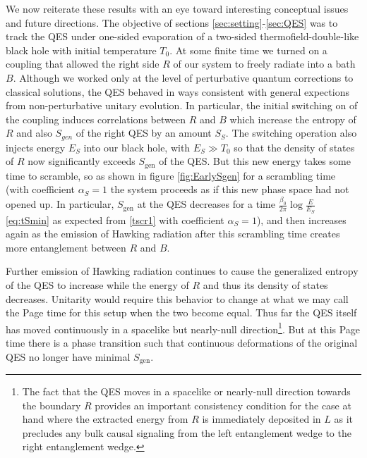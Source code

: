 \documentclass[12pt]{article}
\renewcommand{\ln}{\log}
\begin{document}
We now reiterate these results with an eye toward interesting conceptual issues and future directions.  The objective of sections \ref{sec:setting}-\ref{sec:QES} was to track the QES under one-sided evaporation of a two-sided thermofield-double-like black hole with initial temperature $T_0$.  At some finite time we turned on a coupling that allowed the right side $R$ of our system to freely radiate into a bath $B$. Although we worked only at the level of perturbative quantum corrections to classical solutions, the QES behaved in ways consistent with general expections from non-perturbative unitary evolution.  In particular, the initial switching on of the coupling induces correlations between $R$ and $B$ which increase the entropy of $R$ and also $S_{gen}$ of the right QES by an amount $S_{S}$.  The switching operation also injects energy $E_{S}$ into our black hole, with $E_{S} \gg T_0$ so that the density of states of $R$ now significantly exceeds $S_{\text{gen}}$ of the QES.  But this new energy takes some time to scramble, so as shown in figure \ref{fig:EarlySgen}  for a scrambling time (with coefficient $\alpha_{S}=1$ the system proceeds as if this new phase space had not opened up.  In particular, $S_{\text{gen}}$ at the QES decreases for a time $\frac{\beta_0}{2\pi} \ln \frac{E}{E_S}$  \eqref{eq:tSmin} as expected from \eqref{tscr1} with coefficient $\alpha_{S}=1$),  and then increases again as the emission of Hawking radiation after this scrambling time creates more entanglement between $R$ and $B$.

Further emission of Hawking radiation continues to cause
the generalized entropy of the QES to increase while the energy of $R$ and thus its density of states decreases.  Unitarity would require this behavior to change at what we may call the Page time for this setup  when the two become equal.  Thus far the QES itself has moved continuously in a spacelike but nearly-null direction\footnote{The fact that the QES moves in a spacelike or nearly-null direction towards the boundary $R$ provides an important consistency condition for the case at hand where the extracted energy from $R$ is immediately deposited in $L$ as it precludes any bulk causal signaling from the left entanglement wedge to the right entanglement wedge. }. But at this Page time there is a phase transition such that continuous deformations of the original QES no longer have minimal $S_{\mathrm{gen}}$.
\end{document}
